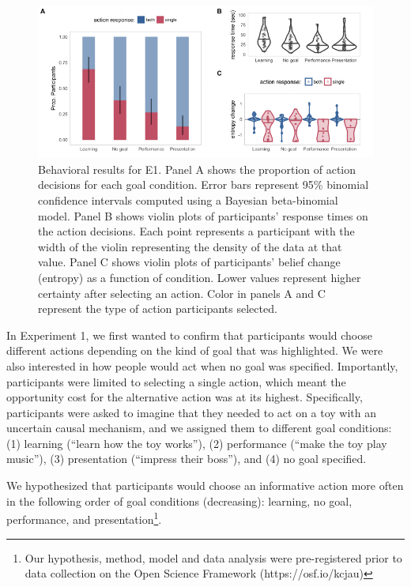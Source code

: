 \documentclass[10pt, letterpaper]{article}
\newenvironment{CodeChunk}{}{}
\begin{document}
\begin{CodeChunk}
\begin{figure}[tb]

{\centering \includegraphics[width=0.95\linewidth]{figs/e1_behav_results_plot-1} 

}

\caption[Behavioral results for E1]{Behavioral results for E1. Panel A shows the proportion of action decisions for each goal condition. Error bars represent 95\% binomial confidence intervals computed using a Bayesian beta-binomial model. Panel B shows violin plots of participants' response times on the action decisions. Each point represents a participant with the width of the violin representing the density of the data at that value. Panel C shows violin plots of participants' belief change (entropy) as a function of condition. Lower values represent higher certainty after selecting an action. Color in panels A and C represent the type of action participants selected.}\label{fig:e1_behav_results_plot}
\end{figure}
\end{CodeChunk}

In Experiment 1, we first wanted to confirm that participants would
choose different actions depending on the kind of goal that was
highlighted. We were also interested in how people would act when no
goal was specified. Importantly, participants were limited to selecting
a single action, which meant the opportunity cost for the alternative
action was at its highest. Specifically, participants were asked to
imagine that they needed to act on a toy with an uncertain causal
mechanism, and we assigned them to different goal conditions: (1)
learning (``learn how the toy works''), (2) performance (``make the toy
play music''), (3) presentation (``impress their boss''), and (4) no
goal specified.

We hypothesized that participants would choose an informative action
more often in the following order of goal conditions (decreasing):
learning, no goal, performance, and
presentation\footnote{Our hypothesis, method, model and data analysis were pre-registered prior to data collection on the Open Science Framework (https://osf.io/kcjau)}.
\end{document}
